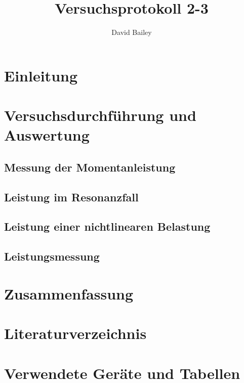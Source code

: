 \documentclass[11pt,a4paper]{article}
\author{David Bailey}
\title{Versuchsprotokoll 2-3}
\numberwithin{equation}{section}
\begin{document}



\tableofcontents

\newpage

\section{Einleitung}


\section{Versuchsdurchführung und Auswertung}
\subsection{Messung der Momentanleistung}


\subsection{Leistung im Resonanzfall}


\subsection{Leistung einer nichtlinearen Belastung}


\subsection{Leistungsmessung}



\section{Zusammenfassung}

\setcounter{section}{0}
\renewcommand{\thesection}{\Alph{section}}
\section{Literaturverzeichnis}
\printbibliography
\section{Verwendete Geräte und Tabellen}
\end{document}
